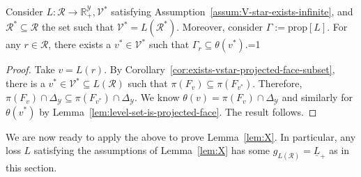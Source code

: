 \documentclass[twoside,11pt]{article}
\newcommand{\Comments}{1}
\newcommand{\mytodo}[2]{\ifnum\Comments=1%
  \todo[linecolor=#1!80!black,backgroundcolor=#1,bordercolor=#1!80!black]{#2}\fi}
\newcommand{\btw}[1]{\mytodo{gray!20!white}{BTW: #1}}%
\newcommand{\reals}{\mathbb{R}}
\newcommand{\prop}[1]{\mathrm{prop}[#1]}
\newcommand{\simplex}{\Delta_\Y}
\newcommand{\R}{\mathcal{R}}
\newcommand{\V}{\mathcal{V}}
\newcommand{\Y}{\mathcal{Y}}
\newcommand{\risk}[1]{\underline{#1}}
\begin{document}
\begin{lemma}\label{lem:any-levelset-contained-in-minlevelset}
  Consider $L : \R \to \reals^\Y_+, \V^*$ satisfying Assumption~\ref{assum:V-star-exists-infinite}, and $\R^* \subseteq \R$ the set such that $\V^* = L(\R^*)$.
  Moreover, consider $\Gamma := \prop{L}$.
  For any $r \in \R$, there exists a $v^* \in \V^*$ such that $\Gamma_r \subseteq \theta(v^*)$.\btw{(7)}
\end{lemma}
\begin{proof}
  Take $v = L(r)$.
  By Corollary~\ref{cor:exists-vstar-projected-face-subset}, there is a $v^* \in \V^* \subseteq L(\R)$ such that $\pi(F_v) \subseteq \pi(F_{v^*})$.
  Therefore, $\pi(F_v) \cap \simplex \subseteq \pi(F_{v^*})\cap \simplex$.  
  We know $\theta(v) = \pi(F_v) \cap \simplex$ and similarly for $\theta(v^*)$ by Lemma~\ref{lem:level-set-is-projected-face}.
  The result follows.
\end{proof}



We are now ready to apply the above to prove Lemma~\ref{lem:X}.
In particular, any loss $L$ satisfying the assumptions of Lemma~\ref{lem:X} has some $g_{L(\R)} = \risk{L}_+$ as in this section. 
\end{document}
